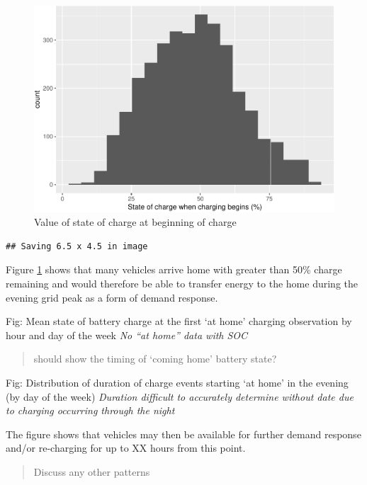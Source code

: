 \documentclass[]{article}
\begin{document}
\begin{figure}
\centering
\includegraphics{EVBB_SummaryReport_files/figure-latex/SoCplot2-1.pdf}
\caption{\label{fig:SoCplot2}Value of state of charge at beginning of
charge}
\end{figure}

\begin{verbatim}
## Saving 6.5 x 4.5 in image
\end{verbatim}

Figure \ref{fig:SoCplot2} shows that many vehicles arrive home with
greater than 50\% charge remaining and would therefore be able to
transfer energy to the home during the evening grid peak as a form of
demand response.

Fig: Mean state of battery charge at the first `at home' charging
observation by hour and day of the week \emph{No ``at home'' data with
SOC}

\begin{quote}
should show the timing of `coming home' battery state?
\end{quote}

Fig: Distribution of duration of charge events starting `at home' in the
evening (by day of the week) \emph{Duration difficult to accurately
determine without date due to charging occurring through the night}

The figure shows that vehicles may then be available for further demand
response and/or re-charging for up to XX hours from this point.

\begin{quote}
Discuss any other patterns
\end{quote}
\end{document}
